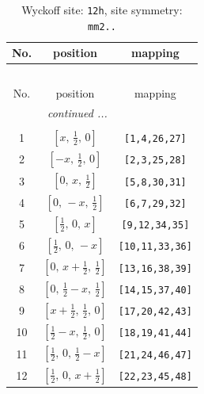 \documentclass[fleqn,8pt]{jsarticle}
\begin{document}
\begin{longtable}{ccc}
\caption{Wyckoff site: {\tt 12h}, site symmetry: {\tt mm2..}}
 \\
 \hline \hline
No. & position & mapping \\ \hline \endfirsthead

\multicolumn{2}{l}{\tablename\ \thetable{}} \\
 \hline \hline
No. & position & mapping \\ \hline \endhead

 \hline \hline
\multicolumn{2}{r}{\footnotesize\it continued ...} \\ \endfoot

 \hline \hline
\multicolumn{2}{r}{} \\ \endlastfoot

1 & $\left[ x,\, \frac{1}{2},\, 0 \right]$ & {\tt [1,4,26,27]} \\ \hline
2 & $\left[ - x,\, \frac{1}{2},\, 0 \right]$ & {\tt [2,3,25,28]} \\ \hline
3 & $\left[ 0,\, x,\, \frac{1}{2} \right]$ & {\tt [5,8,30,31]} \\ \hline
4 & $\left[ 0,\, - x,\, \frac{1}{2} \right]$ & {\tt [6,7,29,32]} \\ \hline
5 & $\left[ \frac{1}{2},\, 0,\, x \right]$ & {\tt [9,12,34,35]} \\ \hline
6 & $\left[ \frac{1}{2},\, 0,\, - x \right]$ & {\tt [10,11,33,36]} \\ \hline
7 & $\left[ 0,\, x + \frac{1}{2},\, \frac{1}{2} \right]$ & {\tt [13,16,38,39]} \\ \hline
8 & $\left[ 0,\, \frac{1}{2} - x,\, \frac{1}{2} \right]$ & {\tt [14,15,37,40]} \\ \hline
9 & $\left[ x + \frac{1}{2},\, \frac{1}{2},\, 0 \right]$ & {\tt [17,20,42,43]} \\ \hline
10 & $\left[ \frac{1}{2} - x,\, \frac{1}{2},\, 0 \right]$ & {\tt [18,19,41,44]} \\ \hline
11 & $\left[ \frac{1}{2},\, 0,\, \frac{1}{2} - x \right]$ & {\tt [21,24,46,47]} \\ \hline
12 & $\left[ \frac{1}{2},\, 0,\, x + \frac{1}{2} \right]$ & {\tt [22,23,45,48]} \\
\end{longtable}
\renewcommand{\arraystretch}{1.2}
\end{document}
